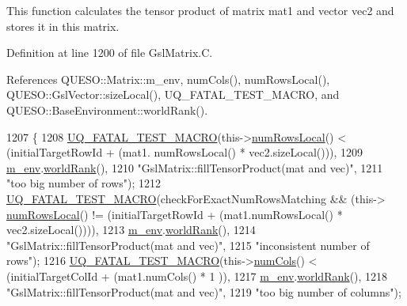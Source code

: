 This function calculates the tensor product of matrix {\ttfamily mat1} and vector {\ttfamily vec2} and stores it in {\ttfamily this} matrix. 



Definition at line 1200 of file Gsl\-Matrix.\-C.



References Q\-U\-E\-S\-O\-::\-Matrix\-::m\-\_\-env, num\-Cols(), num\-Rows\-Local(), Q\-U\-E\-S\-O\-::\-Gsl\-Vector\-::size\-Local(), U\-Q\-\_\-\-F\-A\-T\-A\-L\-\_\-\-T\-E\-S\-T\-\_\-\-M\-A\-C\-R\-O, and Q\-U\-E\-S\-O\-::\-Base\-Environment\-::world\-Rank().


\begin{DoxyCode}
1207 \{
1208   \hyperlink{_defines_8h_a56d63d18d0a6d45757de47fcc06f574d}{UQ\_FATAL\_TEST\_MACRO}(this->\hyperlink{class_q_u_e_s_o_1_1_gsl_matrix_ab5ec937a9fd439eef1a87e12c0dbccb4}{numRowsLocal}() < (initialTargetRowId + (mat1.
      numRowsLocal() * vec2.sizeLocal())),
1209                       \hyperlink{class_q_u_e_s_o_1_1_matrix_a247fb0fc0b87fecdee054bb4660b68e8}{m\_env}.\hyperlink{class_q_u_e_s_o_1_1_base_environment_a78b57112bbd0e6dd0e8afec00b40ffa7}{worldRank}(),
1210                       \textcolor{stringliteral}{"GslMatrix::fillTensorProduct(mat and vec)"},
1211                       \textcolor{stringliteral}{"too big number of rows"});
1212   \hyperlink{_defines_8h_a56d63d18d0a6d45757de47fcc06f574d}{UQ\_FATAL\_TEST\_MACRO}(checkForExactNumRowsMatching && (this->
      \hyperlink{class_q_u_e_s_o_1_1_gsl_matrix_ab5ec937a9fd439eef1a87e12c0dbccb4}{numRowsLocal}() != (initialTargetRowId + (mat1.numRowsLocal() * vec2.sizeLocal()))),
1213                       \hyperlink{class_q_u_e_s_o_1_1_matrix_a247fb0fc0b87fecdee054bb4660b68e8}{m\_env}.\hyperlink{class_q_u_e_s_o_1_1_base_environment_a78b57112bbd0e6dd0e8afec00b40ffa7}{worldRank}(),
1214                       \textcolor{stringliteral}{"GslMatrix::fillTensorProduct(mat and vec)"},
1215                       \textcolor{stringliteral}{"inconsistent number of rows"});
1216   \hyperlink{_defines_8h_a56d63d18d0a6d45757de47fcc06f574d}{UQ\_FATAL\_TEST\_MACRO}(this->\hyperlink{class_q_u_e_s_o_1_1_gsl_matrix_ad5005f168fe030468e834776afb1859b}{numCols}() < (initialTargetColId + (mat1.numCols() * 1
      )),
1217                       \hyperlink{class_q_u_e_s_o_1_1_matrix_a247fb0fc0b87fecdee054bb4660b68e8}{m\_env}.\hyperlink{class_q_u_e_s_o_1_1_base_environment_a78b57112bbd0e6dd0e8afec00b40ffa7}{worldRank}(),
1218                       \textcolor{stringliteral}{"GslMatrix::fillTensorProduct(mat and vec)"},
1219                       \textcolor{stringliteral}{"too big number of columns"});

\end{DoxyCode}

